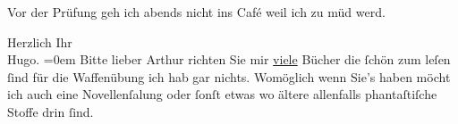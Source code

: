 \pstart
           Vor der Prüfung geh ich abends nicht ins Café weil ich zu müd werd.\pend
           
\pstart
           Herzlich Ihr{\\[\baselineskip]}\spacefill\mbox{Hugo.}\pend
           \leftskip=0em{}
\pstart
           \noindent{}Bitte lieber Arthur richten Sie {\pb}mir \uline{viele} Bücher die ſchön zum leſen ſind für
                  die Waffenübung ich hab gar nichts. Womöglich wenn Sie’s haben möcht ich auch eine
                     Novellenſa{\geminationm}lung oder ſonſt etwas wo ältere
                  allenfalls phantaſtiſche Stoffe drin ſind.\pend
           \endnumbering{}  
      